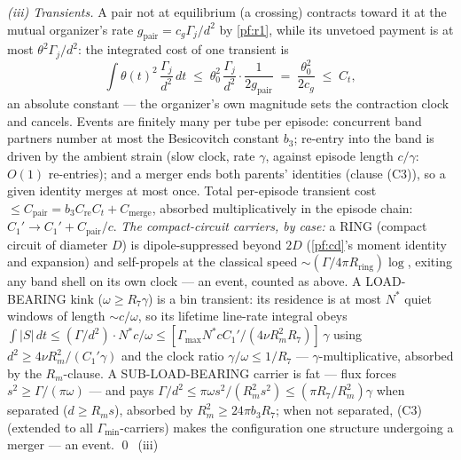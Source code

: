 \documentclass[11pt,letterpaper]{amsart}
\theoremstyle{definition}
\theoremstyle{remark}
\newcommand{\om}{\omega}
\newcommand{\abs}[1]{\lvert #1 \rvert}
\begin{document}
\emph{(iii) Transients.} A pair not at equilibrium (a crossing) contracts toward it
at the mutual organizer's rate $g_{\mathrm{pair}}=c_g\Gamma_j/d^2$ by \cref{pf:r1},
while its unvetoed payment is at most $\theta^2\Gamma_j/d^2$: the integrated cost of
one transient is
\[
\int\theta(t)^2\,\frac{\Gamma_j}{d^2}\,dt
\;\le\;\theta_0^2\,\frac{\Gamma_j}{d^2}\cdot\frac{1}{2g_{\mathrm{pair}}}
\;=\;\frac{\theta_0^2}{2c_g}\;\le\;C_t ,
\]
an absolute constant --- the organizer's own magnitude sets the contraction clock and
cancels. Events are finitely many per tube per episode: concurrent band partners
number at most the Besicovitch constant $b_3$; re-entry into the band is driven by
the ambient strain (slow clock, rate $\gamma$, against episode length $c/\gamma$:
$O(1)$ re-entries); and a merger ends both parents' identities (clause (C3)), so a
given identity merges at most once. Total per-episode transient cost
$\le C_{\mathrm{pair}}=b_3C_{\mathrm{re}}C_t+C_{\mathrm{merge}}$, absorbed
multiplicatively in the episode chain: $C_1'\to C_1'+C_{\mathrm{pair}}/c$. \emph{The compact-circuit carriers,
by case:} a RING (compact circuit of diameter $D$) is dipole-suppressed beyond
$2D$ (\cref{pf:cd}'s moment identity and expansion) and self-propels at the
classical speed $\sim(\Gamma/4\pi R_{\mathrm{ring}})\log$, exiting any band
shell on its own clock --- an event, counted as above. A LOAD-BEARING kink
($\om\ge R_7\gamma$) is a bin transient: its residence is at most $N^*$ quiet
windows of length $\sim c/\om$, so its lifetime line-rate integral obeys
$\int\abs{S}\,dt\le(\Gamma/d^2)\cdot N^*c/\om
\le[\Gamma_{\max}N^*cC_1'/(4\nu R_m^2R_7)]\,\gamma$ using
$d^2\ge4\nu R_m^2/(C_1'\gamma)$ and the clock ratio $\gamma/\om\le1/R_7$ ---
$\gamma$-multiplicative, absorbed by the $R_m$-clause. A SUB-LOAD-BEARING
carrier is fat --- flux forces $s^2\ge\Gamma/(\pi\om)$ --- and pays
$\Gamma/d^2\le\pi\om s^2/(R_m^2s^2)\le(\pi R_7/R_m^2)\gamma$ when separated
($d\ge R_ms$), absorbed by $R_m^2\ge24\pi b_3R_7$; when not separated,
\textup{(C3)} (extended to all $\Gamma_{\min}$-carriers) makes the
configuration one structure undergoing a merger --- an event. \qed\ (iii)
\end{document}
